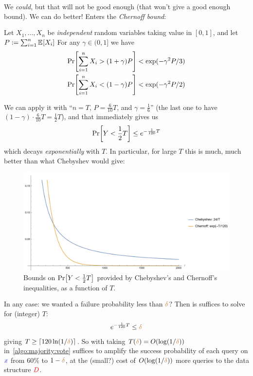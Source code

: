 We \emph{could}, but that will not be good enough (that won't give a good enough bound). We can do better! 
Enters the \emph{Chernoff bound}:
\begin{theorem}
Let $X_1,\dots,X_n$ be \emph{independent} random variables taking value in $[0,1]$, and let $P \eqdef \sum_{i=1}^n \bEE{X_i}$ For any $\gamma \in (0,1]$ we have
\begin{align}
\bPr{\sum_{i=1}^n X_i > (1+\gamma)P } &< \exp(-\gamma^2 P/3)\\
\bPr{\sum_{i=1}^n X_i < (1-\gamma)P } &< \exp(-\gamma^2 P/2)
\end{align}
\end{theorem}
We can apply it with ``$n=T$, $P=\frac{6}{10}T$, and $\gamma=\frac{1}{6}$'' (the last one to have $(1-\gamma)\cdot \frac{6}{10}T = \frac{1}{2}T$), and that immediately gives us
\[
    \bPr{ Y < \frac{1}{2}T } \leq e^{-\frac{1}{120}T}
\]
which decays \emph{exponentially} with $T$. In particular, for large $T$ this is much, much better than what Chebyshev would give:
\begin{figure}
    \centering
    \includegraphics[width=1.25\textwidth]{figures/fig-chernoff-v-chebyshev.png}
    \caption{Bounds on $\bPr{ Y < \frac{1}{2}T }$ provided by Chebyshev's and Chernoff's inequalities, as a function of $T$.}
    \label{fig:chernoff:v:chebyshev}
\end{figure}
In any case: we wanted a failure probability less than ${\textcolor{brown}{\delta}}$? Then is suffices to solve for (integer) $T$:
\[
e^{-\frac{1}{120}T} \leq {\textcolor{brown}{\delta}}
\]
giving $T \geq \left\lceil 120\ln(1/{\textcolor{brown}{\delta}}) \right\rceil$. So with taking $T({\textcolor{brown}{\delta}})=O(\log(1/{\textcolor{brown}{\delta}}))$ in~\cref{algo:majority:vote} suffices to amplify the success probability of each query on $\textcolor{blue}{x}$ from $60\%$ to $1-{\textcolor{brown}{\delta}}$, at the (small?) cost of $O(\log(1/{\textcolor{brown}{\delta}}))$ more queries to the data structure $\textcolor{red}{D}$.

